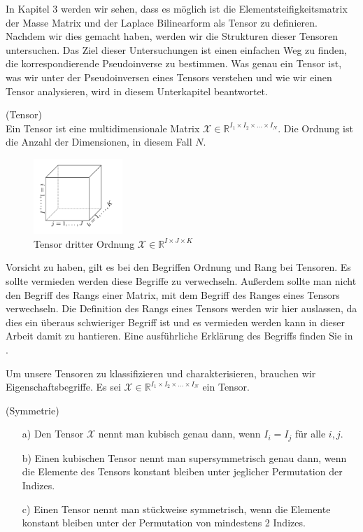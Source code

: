 In Kapitel 3 werden wir sehen, dass es möglich ist die Elementsteifigkeitsmatrix der Masse Matrix und der Laplace Bilinearform als Tensor zu definieren. Nachdem wir dies gemacht haben, werden wir die Strukturen dieser Tensoren untersuchen. Das Ziel dieser Untersuchungen ist einen einfachen Weg zu finden, die korrespondierende Pseudoinverse zu bestimmen. Was genau ein Tensor ist, was wir unter der Pseudoinversen eines Tensors verstehen und wie wir einen Tensor analysieren, wird in diesem Unterkapitel beantwortet.


\begin{Definition} (Tensor) \\
Ein Tensor ist eine multidimensionale Matrix $\pmb{\mathscr{X}}  \in \mathbb{R}^{I_1 \times I_2 \times \dots \times I_N}$.
Die Ordnung ist die Anzahl der Dimensionen, in diesem Fall $N$. 
\end{Definition}

\begin{figure}[ht]
	\centering
  \includegraphics[width=0.3\textwidth]{tensorOrdnung3.png}
	\caption{Tensor dritter Ordnung $\pmb{\mathscr{X}}  \in \mathbb{R}^{I \times J \times K}$ \cite[456]{Kolda}}
	\label{fig:tensorOrdnung3}
\end{figure}

Vorsicht zu haben, gilt es bei den Begriffen Ordnung und Rang bei Tensoren. Es sollte vermieden werden diese Begriffe zu verwechseln. Außerdem sollte man nicht den Begriff des Rangs einer Matrix, mit dem Begriff des Ranges eines Tensors verwechseln. Die Definition des Rangs eines Tensors werden wir hier auslassen, da dies ein überaus schwieriger Begriff ist und es vermieden werden kann in dieser Arbeit damit zu hantieren. Eine ausführliche Erklärung des Begriffs finden Sie in \cite[464]{Kolda}.

\newpage

Um unsere Tensoren zu klassifizieren und charakterisieren, brauchen wir Eigenschaftsbegriffe. Es sei $\pmb{\mathscr{X}}  \in \mathbb{R}^{I_1 \times I_2 \times \dots \times I_N}$ ein Tensor.
\begin{Definition} (Symmetrie)
\begin{itemize}
\item[a)] Den Tensor $\pmb{\mathscr{X}}$ nennt man kubisch genau dann, wenn $I_i = I_j$ für alle $i,j$.
\item[b)] Einen kubischen Tensor nennt man supersymmetrisch genau dann, wenn die Elemente des Tensors konstant bleiben unter jeglicher Permutation der Indizes.
\item[c)] Einen Tensor nennt man stückweise symmetrisch, wenn die Elemente konstant bleiben unter der Permutation von mindestens 2 Indizes.
\end{itemize}
\end{Definition}

